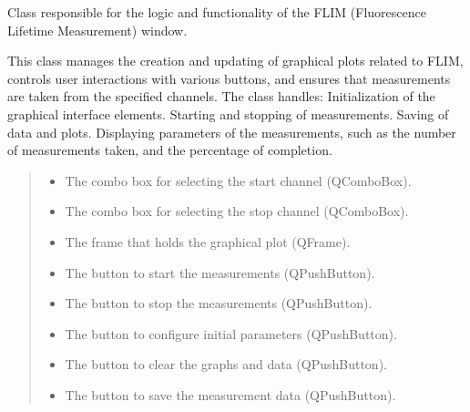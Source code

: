 \documentclass[letterpaper,10pt,english]{sphinxmanual}
\begin{document}
\begin{fulllineitems}
\sphinxAtStartPar
Class responsible for the logic and functionality of the FLIM (Fluorescence Lifetime Measurement) window.

\sphinxAtStartPar
This class manages the creation and updating of graphical plots related to FLIM, controls user interactions with various 
buttons, and ensures that measurements are taken from the specified channels. The class handles:
\sphinxhyphen{} Initialization of the graphical interface elements.
\sphinxhyphen{} Starting and stopping of measurements.
\sphinxhyphen{} Saving of data and plots.
\sphinxhyphen{} Displaying parameters of the measurements, such as the number of measurements taken, and the percentage of completion.
\begin{quote}\begin{description}
\begin{itemize}
\item {} 
\sphinxAtStartPar
{} \textendash{} The combo box for selecting the start channel (QComboBox).

\item {} 
\sphinxAtStartPar
{} \textendash{} The combo box for selecting the stop channel (QComboBox).

\item {} 
\sphinxAtStartPar
{} \textendash{} The frame that holds the graphical plot (QFrame).

\item {} 
\sphinxAtStartPar
{} \textendash{} The button to start the measurements (QPushButton).

\item {} 
\sphinxAtStartPar
{} \textendash{} The button to stop the measurements (QPushButton).

\item {} 
\sphinxAtStartPar
{} \textendash{} The button to configure initial parameters (QPushButton).

\item {} 
\sphinxAtStartPar
{} \textendash{} The button to clear the graphs and data (QPushButton).

\item {} 
\sphinxAtStartPar
{} \textendash{} The button to save the measurement data (QPushButton).


\end{itemize}
\end{description}
\end{quote}
\end{fulllineitems}
\end{document}
